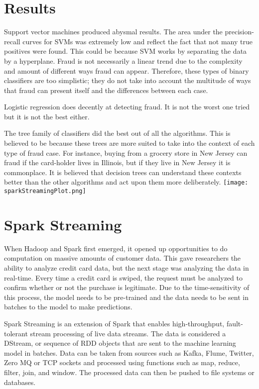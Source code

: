 \documentclass[9pt,twocolumn,twoside]{idsi}
\begin{document}
\section{Results} 

Support vector machines produced abysmal results. The area under the precision-recall curves for SVMs was extremely low and reflect the fact that not many true positives were found. This could be because SVM works by separating the data by a hyperplane. Fraud is not necessarily a linear trend due to the complexity and amount of different ways fraud can appear. Therefore, these types of binary classifiers are too simplistic; they do not take into account the multitude of ways that fraud can present itself and the differences between each case.


Logistic regression does decently at detecting fraud. It is not the worst one tried but it is not the best either. 


The tree family of classifiers did the best out of all the algorithms. This is believed to be because these trees are more suited to take into the context of each type of fraud case. For instance, buying from a grocery store in New Jersey can fraud if the card-holder lives in Illinois, but if they live in New Jersey it is commonplace. It is believed that decision trees can understand these contexts better than the other algorithms and act upon them more deliberately.
\texttt{[image: sparkStreamingPlot.png]}

\section{Spark Streaming}

When Hadoop and Spark first emerged, it opened up opportunities to do computation on massive amounts of customer data. This gave researchers the ability to analyze credit card data, but the next stage was analyzing the data in real-time. Every time a credit card is swiped, the request must be analyzed to confirm whether or not the purchase is legitimate. Due to the time-sensitivity of this process, the model needs to be pre-trained and the data needs to be sent in batches to the model to make predictions. 

Spark Streaming is an extension of Spark that enables high-throughput, fault-tolerant stream processing of live data streams. The data is considered a DStream, or  sequence of RDD objects that are sent to the machine learning model in batches. \cite{stypinski2017apache} Data can be taken from sources such as Kafka, Flume, Twitter, Zero MQ or TCP sockets and processed using functions such as map, reduce, filter, join, and window. The processed data can then be pushed to file systems or databases. \cite{sparkstreaming} 
\end{document}
